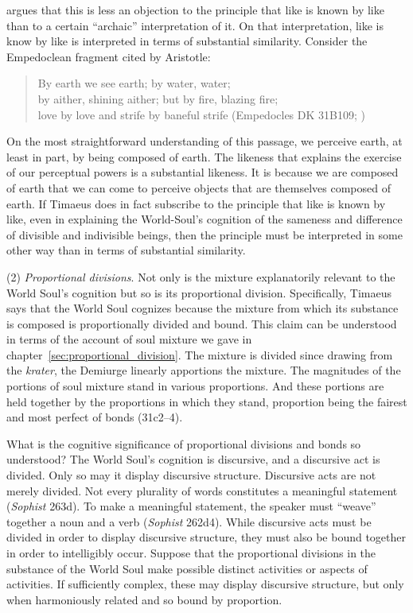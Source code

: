 \citet{Corcilius:2018bd} argues that this is less an objection to the principle that like is known by like than to a certain ``archaic'' interpretation of it. On that interpretation, like is know by like is interpreted in terms of substantial similarity. Consider the Empedoclean fragment cited by Aristotle:
\begin{verse}
	By earth we see earth; by water, water;\\
	by aither, shining aither; but by fire, blazing fire;\\
	love by love and strife by baneful strife (Empedocles DK 31B109; \citealt[221]{Inwood:2001ve})
\end{verse}
On the most straightforward understanding of this passage, we perceive earth, at least in part, by being composed of earth. The likeness that explains the exercise of our perceptual powers is a substantial likeness. It is because we are composed of earth that we can come to perceive objects that are themselves composed of earth. If Timaeus does in fact subscribe to the principle that like is known by like, even in explaining the World-Soul's cognition of the sameness and difference of divisible and indivisible beings, then the principle must be interpreted in some other way than in terms of substantial similarity.

(2) \emph{Proportional divisions}. Not only is the mixture explanatorily relevant to the World Soul's cognition but so is its proportional division. Specifically, Timaeus says that the World Soul cognizes because the mixture from which its substance is composed is proportionally divided and bound. This claim can be understood in terms of the account of soul mixture we gave in chapter~\ref{sec:proportional_division}. The mixture is divided since drawing from the \emph{krater}, the Demiurge linearly apportions the mixture. The magnitudes of the portions of soul mixture stand in various proportions. And these portions are held together by the proportions in which they stand, proportion being the fairest and most perfect of bonds (31c2--4).

What is the cognitive significance of proportional divisions and bonds so understood? The World Soul's cognition is discursive, and a discursive act is divided. Only so may it display discursive structure. Discursive acts are not merely divided. Not every plurality of words constitutes a meaningful statement (\emph{Sophist} 263d). To make a meaningful statement, the speaker must ``weave'' together a noun and a verb (\emph{Sophist} 262d4). While discursive acts must be divided in order to display discursive structure, they must also be bound together in order to intelligibly occur. Suppose that the proportional divisions in the substance of the World Soul make possible distinct activities or aspects of activities. If sufficiently complex, these may display discursive structure, but only when harmoniously related and so bound by proportion.

